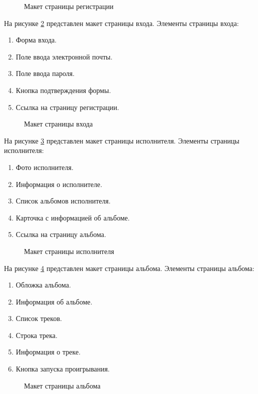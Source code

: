 \begin{figure}[ht]
	\caption{Макет страницы регистрации}
	\label{regMaket:image}
\end{figure}
На рисунке \ref{loginMaket:image} представлен макет страницы входа. Элементы страницы входа:
\begin{enumerate}
	\item Форма входа.
	\item Поле ввода электронной почты.
	\item Поле ввода пароля.
	\item Кнопка подтверждения формы.
	\item Ссылка на страницу регистрации.
\end{enumerate} 
\begin{figure}[ht]
	\caption{Макет страницы входа}
	\label{loginMaket:image}
\end{figure}
На рисунке \ref{artistMaket:image} представлен макет страницы исполнителя. Элементы страницы исполнителя:
\begin{samepage}
	\begin{enumerate}
		\item Фото исполнителя.
		\item Информация о исполнителе.
		\item Список альбомов исполнителя.
		\item Карточка с информацией об альбоме.
		\item Ссылка на страницу альбома.
	\end{enumerate} 
\end{samepage}
\begin{figure}[ht]
	\caption{Макет страницы исполнителя}
	\label{artistMaket:image}
\end{figure}
На рисунке \ref{albumMaket:image} представлен макет страницы альбома. Элементы страницы альбома:
\begin{enumerate}
	\item Обложка альбома.
	\item Информация об альбоме.
	\item Список треков.
	\item Строка трека.
	\item Информация о треке.
	\item Кнопка запуска проигрывания.
\end{enumerate} 
\begin{figure}[ht]
	\caption{Макет страницы альбома}
	\label{albumMaket:image}
\end{figure}

